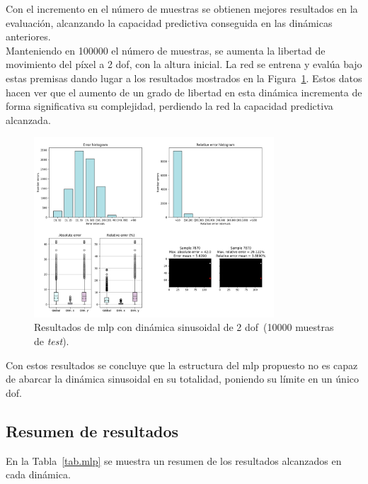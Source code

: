 Con el incremento en el número de muestras se obtienen mejores resultados en la evaluación, alcanzando la capacidad predictiva conseguida en las dinámicas anteriores.\\

Manteniendo en 100000 el número de muestras, se aumenta la libertad de movimiento del píxel a 2 \acrshort{dof}, con la altura inicial. La red se entrena y evalúa bajo estas premisas dando lugar a los resultados mostrados en la Figura~\ref{fig.norec_sin_var_100000}. Estos datos hacen ver que el aumento de un grado de libertad en esta dinámica incrementa de forma significativa su complejidad, perdiendo la red la capacidad predictiva alcanzada.

\begin{figure}[H]
		\begin{center}
			\includegraphics[width=0.8\textwidth]{ figures/test_mod/NOREC/sin_var_100000.png}
			\caption{Resultados de \acrshort{mlp} con dinámica sinusoidal de 2 \acrshort{dof}~(10000 muestras de \textit{test}).}
			\label{fig.norec_sin_var_100000}
		\end{center}
\end{figure}
\vspace{-10pt}

Con estos resultados se concluye que la estructura del \acrshort{mlp} propuesto no es capaz de abarcar la dinámica sinusoidal en su totalidad, poniendo su límite en un único \acrshort{dof}.

\subsection{Resumen de resultados} \label{ap.resumen_RNNmlp}
En la Tabla~\ref{tab.mlp} se muestra un resumen de los resultados alcanzados en cada dinámica.

